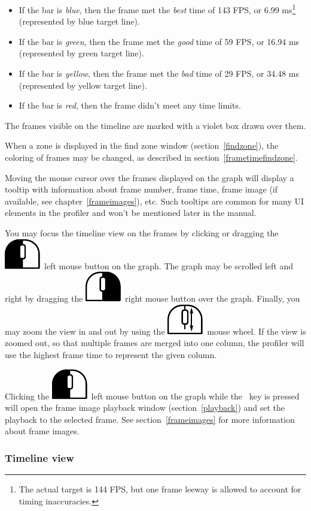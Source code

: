 \documentclass[hidelinks,titlepage,a4paper]{article}
\newcommand{\LMB}{\includegraphics[height=.8\baselineskip]{icons/lmb}}
\newcommand{\RMB}{\includegraphics[height=.8\baselineskip]{icons/rmb}}
\newcommand{\Scroll}{\includegraphics[height=.8\baselineskip]{icons/scroll}}
\begin{document}
\begin{itemize}
\item If the bar is \emph{blue}, then the frame met the \emph{best} time of 143 FPS, or 6.99 \si{\milli\second}\footnote{The actual target is 144 FPS, but one frame leeway is allowed to account for timing inaccuracies.} (represented by blue target line).
\item If the bar is \emph{green}, then the frame met the \emph{good} time of 59 FPS, or 16.94 \si{\milli\second} (represented by green target line).
\item If the bar is \emph{yellow}, then the frame met the \emph{bad} time of 29 FPS, or 34.48 \si{\milli\second} (represented by yellow target line).
\item If the bar is \emph{red}, then the frame didn't meet any time limits.
\end{itemize}

The frames visible on the timeline are marked with a violet box drawn over them.

When a zone is displayed in the find zone window (section~\ref{findzone}), the coloring of frames may be changed, as described in section~\ref{frametimefindzone}.

Moving the \faMousePointer{} mouse cursor over the frames displayed on the graph will display a tooltip with information about frame number, frame time, frame image (if available, see chapter~\ref{frameimages}), etc. Such tooltips are common for many UI elements in the profiler and won't be mentioned later in the manual.

You may focus the timeline view on the frames by clicking or dragging the \LMB{}~left mouse button on the graph. The graph may be scrolled left and right by dragging the \RMB{}~right mouse button over the graph. Finally, you may zoom the view in and out by using the \Scroll{}~mouse wheel. If the view is zoomed out, so that multiple frames are merged into one column, the profiler will use the highest frame time to represent the given column.

Clicking the \LMB{}~left mouse button on the graph while the \keys{\ctrl}~key is pressed will open the frame image playback window (section~\ref{playback}) and set the playback to the selected frame. See section~\ref{frameimages} for more information about frame images.

\subsubsection{Timeline view}
\end{document}
